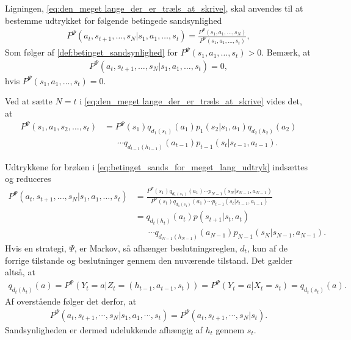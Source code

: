 Ligningen, \eqref{eq:den_meget lange_der_er_træls_at_skrive}, skal anvendes til at bestemme udtrykket for følgende betingede sandsynlighed 
\begin{align}
    P^\Psi(a_t , s_{t+1}, \dots, s_N | s_1 , a_1 , \dots , s_t) = \frac{P^\Psi(s_1 , a_1 , \dots , s_N)}{P^\Psi(s_1 , a_1 , \dots , s_t)}, \label{eq:betinget_sands_for_meget_lang_udtryk}
\end{align}
Som følger af 
\autoref{def:betinget_sandsynlighed} for $P^\Psi(s_1 , a_1 , \dots , s_t) > 0$. Bemærk, at
\begin{align*}
    P^\Psi(a_t , s_{t+1}, \dots, s_N | s_1 , a_1 , \dots , s_t) = 0, 
\end{align*}
hvis $P^\Psi(s_1 , a_1 , \dots , s_t) = 0$.


Ved at sætte $N=t$ i \eqref{eq:den_meget lange_der_er_træls_at_skrive} vides det, at 
\begin{align*}
    P^\Psi(s_1 , a_1 , s_2 , \dots , s_t) &= P^\Psi(s_1)q_{d_1(s_1)}(a_1)p_1(s_2|s_1 , a_1)q_{d_2(h_2)}(a_2)\\
     &\phantom{= \ }\cdots q_{d_{t-1}(h_{t-1})}(a_{t-1})p_{t-1}(s_t|s_{t-1}, a_{t-1}).
\end{align*}

Udtrykkene for brøken i \eqref{eq:betinget_sands_for_meget_lang_udtryk} indsættes og reduceres
\begin{align*}
P^\Psi(a_t , s_{t+1}, \dots, s_N | s_1 , a_1 , \dots , s_t) &=\frac{P^\Psi(s_1)q_{d_1(s_1)}(a_1)
    \cdots p_{N-1}(s_N|s_{N-1} , a_{N-1})}{P^\Psi(s_1)q_{d_1(s_1)}(a_1)
    \cdots p_{t-1}(s_t|s_{t-1} , a_{t-1})}\\
    &= q_{d_t(h_t)}(a_t)p(s_{t+1}|s_t , a_t)\\
    &\phantom{= \ } \cdots q_{d_{N-1}(h_{N-1})}(a_{N-1})p_{N-1}(s_N|s_{N-1} , a_{N-1}).
\end{align*}
Hvis en strategi, $\Psi$, er Markov, så afhænger beslutningsreglen, $d_t$, kun af de forrige tilstande og beslutninger gennem den nuværende tilstand. Det gælder altså, at 
\begin{align*}
    q_{d_t(h_t)}(a)= P^\Psi \left(Y_t = a | Z_t = (h_{t-1} , a_{t-1} , s_t) \right) = P^\Psi \left(Y_t = a | X_t = s_t\right) = q_{d_t(s_t)}(a).
\end{align*}
Af overstående følger det derfor, at
\begin{align*}
    P^{\Psi}\left(a_t , s_{t+1} , \cdots , s_N|s_1 , a_1 , \cdots , s_t\right)=P^{\Psi}\left(a_t , s_{t+1} , \cdots , s_N|s_t\right).
\end{align*}
Sandsynligheden er dermed udelukkende afhængig af $h_t$ gennem $s_t$. 

